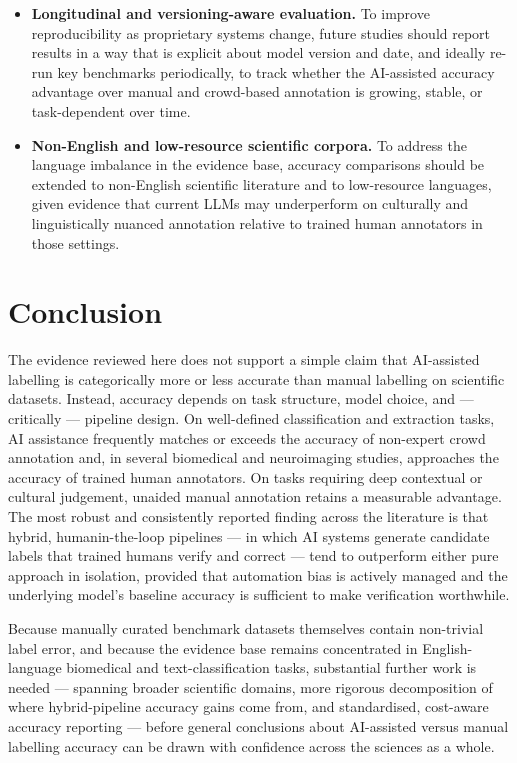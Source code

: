 \documentclass[acmsmall,nonacm]{acmart}
\begin{document}
\begin{itemize}
    \item \textbf{Longitudinal and versioning-aware evaluation.} To improve reproducibility as proprietary systems change, future studies should report results in a way that is explicit about model version and date, and ideally re-run key benchmarks periodically, to track whether the AI-assisted accuracy advantage over manual and crowd-based annotation is growing, stable, or task-dependent over time.

    \item \textbf{Non-English and low-resource scientific corpora.} To address the language imbalance in the evidence base, accuracy comparisons should be extended to non-English scientific literature and to low-resource languages, given evidence that current LLMs may underperform on culturally and linguistically nuanced annotation relative to trained human annotators in those settings.
\end{itemize}

\section{Conclusion}
\label{sec:conclusion}

The evidence reviewed here does not support a simple claim that AI-assisted labelling is categorically more or less accurate than manual labelling on scientific datasets. Instead, accuracy depends on task structure, model choice, and --- critically --- pipeline design. On well-defined classification and extraction tasks, AI assistance frequently matches or exceeds the accuracy of non-expert crowd annotation and, in several biomedical and neuroimaging studies, approaches the accuracy of trained human annotators. On tasks requiring deep contextual or cultural judgement, unaided manual annotation retains a measurable advantage. The most robust and consistently reported finding across the literature is that hybrid, humanin-the-loop pipelines --- in which AI systems generate candidate labels that trained humans verify and correct --- tend to outperform either pure approach in isolation, provided that automation bias is actively managed and the underlying model's baseline accuracy is sufficient to make verification worthwhile.

Because manually curated benchmark datasets themselves contain non-trivial label error, and because the evidence base remains concentrated in English-language biomedical and text-classification tasks, substantial further work is needed --- spanning broader scientific domains, more rigorous decomposition of where hybrid-pipeline accuracy gains come from, and standardised, cost-aware accuracy reporting --- before general conclusions about AI-assisted versus manual labelling accuracy can be drawn with confidence across the sciences as a whole.



\end{document}
